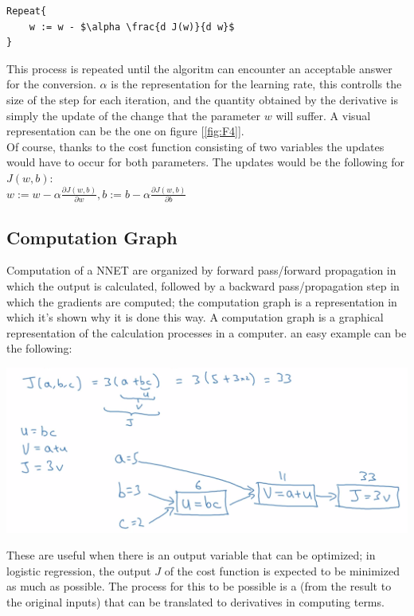 \documentclass[11pt]{report}
\begin{document}
\begin{lstlisting}[mathescape=true]
Repeat{
    w := w - $\alpha \frac{d J(w)}{d w}$
}
\end{lstlisting}
This process is repeated until the algoritm can encounter an acceptable answer for the conversion. $\alpha$ is the representation for the learning rate, this controlls the size of the step for each iteration, and the quantity obtained by the derivative is simply the update of the change that the parameter $w$ will suffer. A visual representation can be the one on figure [\ref{fig:F4}].\\
Of course, thanks to the cost function consisting of two variables the updates would have to occur for both parameters. The updates would be the following for $J(w,b)$:\\
$w := w - \alpha \frac{\partial J(w,b)}{\partial w}, b := b - \alpha \frac{\partial J(w,b)}{\partial b}$\\

\subsection{Computation Graph}
Computation of a NNET are organized by forward pass/forward propagation in which the output is calculated, followed by a backward pass/propagation step in which the gradients are computed; the computation graph is a representation in which it's shown why it is done this way. A computation graph is a graphical representation of the calculation processes in a computer. an easy example can be the following:
\begin{center}
    \includegraphics[width = .75\textwidth]{CG.png}
\end{center}
These are useful when there is an output variable that can be optimized; in logistic regression, the output $J$ of the cost function is expected to be minimized as much as possible. The process for this to be possible is a  (from the result to the original inputs) that can be translated to derivatives in computing terms.
\end{document}
